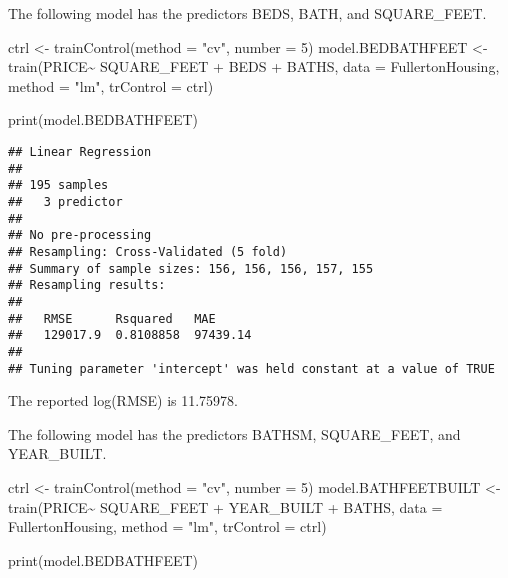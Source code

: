 \documentclass[
]{article}
\newenvironment{Shaded}{\begin{snugshade}}{\end{snugshade}}
\newcommand{\AttributeTok}[1]{\textcolor[rgb]{0.77,0.63,0.00}{#1}}
\newcommand{\DecValTok}[1]{\textcolor[rgb]{0.00,0.00,0.81}{#1}}
\newcommand{\FunctionTok}[1]{\textcolor[rgb]{0.00,0.00,0.00}{#1}}
\newcommand{\NormalTok}[1]{#1}
\newcommand{\OtherTok}[1]{\textcolor[rgb]{0.56,0.35,0.01}{#1}}
\newcommand{\SpecialCharTok}[1]{\textcolor[rgb]{0.00,0.00,0.00}{#1}}
\newcommand{\StringTok}[1]{\textcolor[rgb]{0.31,0.60,0.02}{#1}}
\begin{document}
The following model has the predictors BEDS, BATH, and SQUARE\_FEET.

\begin{Shaded}
\begin{Highlighting}[]
\NormalTok{ctrl }\OtherTok{\textless{}{-}} \FunctionTok{trainControl}\NormalTok{(}\AttributeTok{method =} \StringTok{"cv"}\NormalTok{, }\AttributeTok{number =} \DecValTok{5}\NormalTok{)}
\NormalTok{model.BEDBATHFEET }\OtherTok{\textless{}{-}} \FunctionTok{train}\NormalTok{(PRICE}\SpecialCharTok{\textasciitilde{}}\NormalTok{ SQUARE\_FEET }\SpecialCharTok{+}\NormalTok{ BEDS }\SpecialCharTok{+}\NormalTok{ BATHS, }
               \AttributeTok{data =}\NormalTok{ FullertonHousing, }\AttributeTok{method =} \StringTok{"lm"}\NormalTok{, }\AttributeTok{trControl =}\NormalTok{ ctrl)}

\FunctionTok{print}\NormalTok{(model.BEDBATHFEET)}
\end{Highlighting}
\end{Shaded}

\begin{verbatim}
## Linear Regression 
## 
## 195 samples
##   3 predictor
## 
## No pre-processing
## Resampling: Cross-Validated (5 fold) 
## Summary of sample sizes: 156, 156, 156, 157, 155 
## Resampling results:
## 
##   RMSE      Rsquared   MAE     
##   129017.9  0.8108858  97439.14
## 
## Tuning parameter 'intercept' was held constant at a value of TRUE
\end{verbatim}

The reported log(RMSE) is 11.75978.

The following model has the predictors BATHSM, SQUARE\_FEET, and
YEAR\_BUILT.

\begin{Shaded}
\begin{Highlighting}[]
\NormalTok{ctrl }\OtherTok{\textless{}{-}} \FunctionTok{trainControl}\NormalTok{(}\AttributeTok{method =} \StringTok{"cv"}\NormalTok{, }\AttributeTok{number =} \DecValTok{5}\NormalTok{)}
\NormalTok{model.BATHFEETBUILT }\OtherTok{\textless{}{-}} \FunctionTok{train}\NormalTok{(PRICE}\SpecialCharTok{\textasciitilde{}}\NormalTok{ SQUARE\_FEET }\SpecialCharTok{+}\NormalTok{ YEAR\_BUILT }\SpecialCharTok{+}\NormalTok{ BATHS, }
               \AttributeTok{data =}\NormalTok{ FullertonHousing, }\AttributeTok{method =} \StringTok{"lm"}\NormalTok{, }\AttributeTok{trControl =}\NormalTok{ ctrl)}

\FunctionTok{print}\NormalTok{(model.BEDBATHFEET)}
\end{Highlighting}
\end{Shaded}
\end{document}
